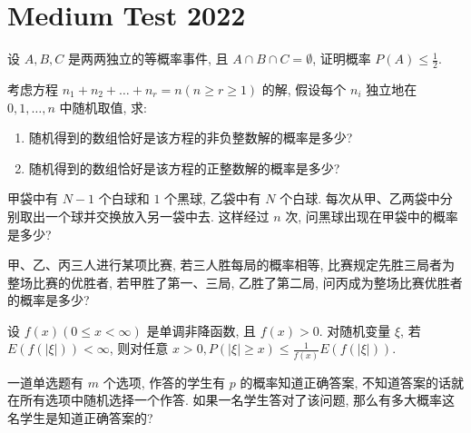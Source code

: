 \documentclass[../main.tex]{subfiles}
\begin{document}
\ifSubfilesClassLoaded{

    
}{}

\chapter{ Medium Test 2022 }

\begin{exercise}{}{}
设 $A, B, C$ 是两两独立的等概率事件, 且 $A \cap B \cap C = \emptyset$, 证明概率 $P(A) \le \frac{1}{2}$.
\end{exercise}

\begin{exercise}{}{}
考虑方程 $n_1 + n_2 + \dots + n_r = n (n \ge r \ge 1)$ 的解, 假设每个 $n_i$ 独立地在 $0, 1, \dots, n$ 中随机取值, 求:
\begin{enumerate}
    \item[(a)] 随机得到的数组恰好是该方程的非负整数解的概率是多少?
    \item[(b)] 随机得到的数组恰好是该方程的正整数解的概率是多少?
\end{enumerate}
\end{exercise}

\begin{exercise}{}{}
甲袋中有 $N-1$ 个白球和 $1$ 个黑球, 乙袋中有 $N$ 个白球. 每次从甲、乙两袋中分别取出一个球并交换放入另一袋中去. 这样经过 $n$ 次, 问黑球出现在甲袋中的概率是多少?
\end{exercise}

\begin{exercise}{}{}
甲、乙、丙三人进行某项比赛, 若三人胜每局的概率相等, 比赛规定先胜三局者为整场比赛的优胜者, 若甲胜了第一、三局, 乙胜了第二局, 问丙成为整场比赛优胜者的概率是多少?
\end{exercise}

\begin{exercise}{}{}
设 $f(x) (0 \le x < \infty)$ 是单调非降函数, 且 $f(x) > 0$. 对随机变量 $\xi$, 若 $E(f(|\xi|)) < \infty$, 则对任意 $x > 0, P(|\xi| \ge x) \le \frac{1}{f(x)}E(f(|\xi|))$.
\end{exercise}

\begin{exercise}{}{}
一道单选题有 $m$ 个选项, 作答的学生有 $p$ 的概率知道正确答案, 不知道答案的话就在所有选项中随机选择一个作答. 如果一名学生答对了该问题, 那么有多大概率这名学生是知道正确答案的?
\end{exercise}
\end{document}
